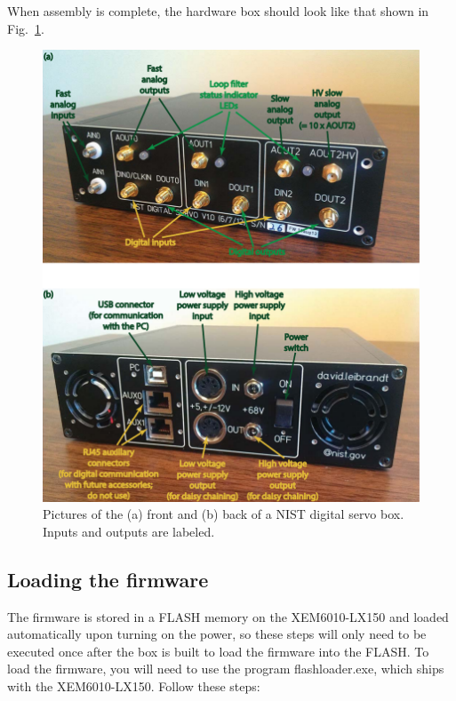\documentclass[aip,rsi,preprint,graphicx]{revtex4-1}
\begin{document}
When assembly is complete, the hardware box should look like that shown in Fig.~\ref{fig:DigitalServoOutsidePic}.

\begin{figure}
\begin{center}
\includegraphics[width=1.0\textwidth]{Figs/DigitalServoOutsideWithLabels}
\caption{\label{fig:DigitalServoOutsidePic}Pictures of the (a) front and (b) back of a NIST digital servo box.  Inputs and outputs are labeled.}
\end{center}
\end{figure}

\subsection{Loading the firmware}\label{sec:loadFirmware}

The firmware is stored in a FLASH memory on the XEM6010-LX150 and loaded automatically upon turning on the power, so these steps will only need to be executed once after the box is built to load the firmware into the FLASH.  To load the firmware, you will need to use the program flashloader.exe, which ships with the XEM6010-LX150.  Follow these steps:
\end{document}
